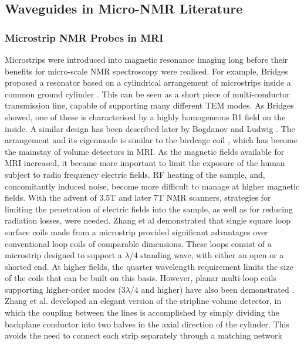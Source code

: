\subsection{Waveguides in Micro-NMR
Literature}\label{waveguides-in-micro-nmr-literature}

\subsubsection{Microstrip NMR Probes in
MRI}\label{microstrip-nmr-probes-in-mri}

Microstrips were introduced into magnetic resonance imaging long before
their benefits for micro-scale NMR spectroscopy were realised. For
example, Bridges proposed a resonator based on a cylindrical arrangement
of microstrips inside a common ground cylinder \cite{Bridges:1988vz}. This
can be seen as a short piece of multi-conductor transmission line,
capable of supporting many different TEM modes. As Bridges showed, one
of these is characterised by a highly homogeneous B1 field on the
inside. A similar design has been described later by Bogdanov and Ludwig
\cite{Bogdanov:2002gv}. The arrangement and its eigenmode is similar to the
birdcage coil \cite{Hayes:1985bw}, which has become the mainstay of volume
detectors in MRI. As the magnetic fields available for MRI increased, it
became more important to limit the exposure of the human subject to
radio frequency electric fields. RF heating of the sample, and,
concomitantly induced noise, become more difficult to manage at higher
magnetic fields. With the advent of 3.5T and later 7T NMR scanners,
strategies for limiting the penetration of electric fields into the
sample, as well as for reducing radiation losses, were needed. Zhang et
al \cite{Zhang:2001js,Zhang:2006wc} demonstrated that single square loop
surface coils made from a microstrip provided significant advantages
over conventional loop coils of comparable dimensions. These loops
consist of a microstrip designed to support a
$\lambda/4$ standing wave, with either
an open or a shorted end. At higher fields, the quarter wavelength
requirement limits the size of the coils that can be built on this
basis. However, planar multi-loop coils supporting higher-order modes
($3\lambda/4$ and higher) have also been
demonstrated \cite{Zhang:2005cr}. Zhang et al. developed an elegant version
of the stripline volume detector, in which the coupling between the
lines is accomplished by simply dividing the backplane conductor into
two halves in the axial direction of the cylinder. This avoids the need
to connect each strip separately through a matching network
